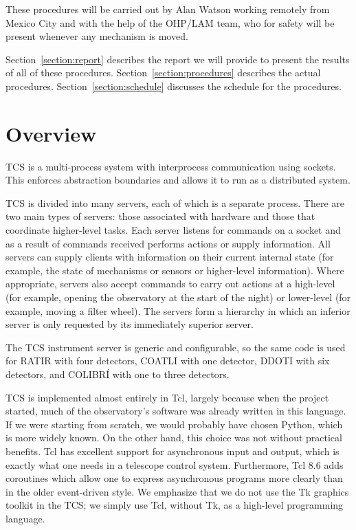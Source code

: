 \documentclass{article}
\begin{document}
These procedures will be carried out by Alan Watson working remotely from Mexico City and with the help of the OHP/LAM team, who for safety will be present whenever any mechanism is moved.

Section~\ref{section:report} describes the report we will provide to present the results of all of these procedures. Section~\ref{section:procedures} describes the actual procedures. Section~\ref{section:schedule} discusses the schedule for the procedures. 

\section{Overview}

TCS is a multi-process system with interprocess communication using sockets. This enforces abstraction boundaries and allows it to run as a distributed system.

TCS is divided into many servers, each of which is a separate process. There are two main types of servers: those associated with hardware and those that coordinate higher-level tasks. Each server listens for commands on a socket and as a result of commands received performs actions or supply information. All servers can supply clients with information on their current internal state (for example, the state of mechanisms or sensors or higher-level information). Where appropriate, servers also accept commands to carry out actions at a high-level (for example, opening the observatory at the start of the night) or lower-level (for example, moving a filter wheel). The servers form a hierarchy in which an inferior server is only requested by its immediately superior server. 

The TCS instrument server is generic and configurable, so the same code is used for RATIR with four detectors, COATLI with one detector, DDOTI with six detectors, and COLIBRÍ with one to three detectors.

TCS is implemented almost entirely in Tcl, largely because when the project started, much of the observatory's software was already written in this language. If we were starting from scratch, we would probably have chosen Python, which is more widely known. On the other hand, this choice was not without practical benefits. Tcl has excellent support for asynchronous input and output, which is exactly what one needs in a telescope control system. Furthermore, Tcl 8.6 adds coroutines which allow one to express asynchronous programs more clearly than in the older event-driven style. We emphasize that we do not use the Tk graphics toolkit in the TCS; we simply use Tcl, without Tk, as a high-level programming language.
\end{document}
